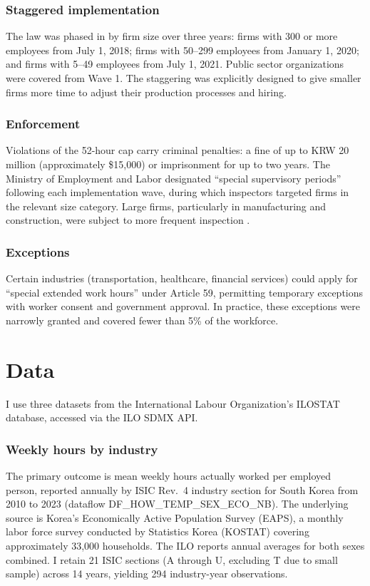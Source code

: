 \documentclass[12pt]{article}
\begin{document}
\subsubsection*{Staggered implementation} The law was phased in by firm size over three years: firms with 300 or more employees from July 1, 2018; firms with 50--299 employees from January 1, 2020; and firms with 5--49 employees from July 1, 2021. Public sector organizations were covered from Wave 1. The staggering was explicitly designed to give smaller firms more time to adjust their production processes and hiring.

\subsubsection*{Enforcement} Violations of the 52-hour cap carry criminal penalties: a fine of up to KRW 20 million (approximately \$15,000) or imprisonment for up to two years. The Ministry of Employment and Labor designated ``special supervisory periods'' following each implementation wave, during which inspectors targeted firms in the relevant size category. Large firms, particularly in manufacturing and construction, were subject to more frequent inspection \citep{ahn2020}.

\subsubsection*{Exceptions} Certain industries (transportation, healthcare, financial services) could apply for ``special extended work hours'' under Article 59, permitting temporary exceptions with worker consent and government approval. In practice, these exceptions were narrowly granted and covered fewer than 5\% of the workforce.

\section{Data}
\label{sec:data}

I use three datasets from the International Labour Organization's ILOSTAT database, accessed via the ILO SDMX API.

\subsubsection*{Weekly hours by industry} The primary outcome is mean weekly hours actually worked per employed person, reported annually by ISIC Rev.~4 industry section for South Korea from 2010 to 2023 (dataflow DF\_HOW\_\allowbreak{}TEMP\_\allowbreak{}SEX\_\allowbreak{}ECO\_NB). The underlying source is Korea's Economically Active Population Survey (EAPS), a monthly labor force survey conducted by Statistics Korea (KOSTAT) covering approximately 33,000 households. The ILO reports annual averages for both sexes combined. I retain 21 ISIC sections (A through U, excluding T due to small sample) across 14 years, yielding 294 industry-year observations.
\end{document}
